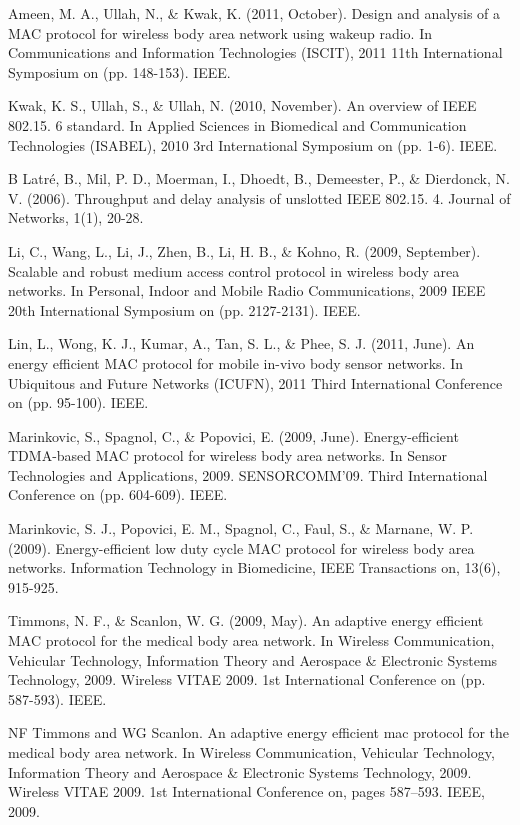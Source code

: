 \documentclass[11pt, conference, compsocconf, onecolumn]{IEEEtran}
\begin{document}
\begin{thebibliography}{0}

 Ameen, M. A., Ullah, N., \& Kwak, K. (2011, October). Design and analysis of a MAC protocol for wireless body area network using wakeup radio. In Communications and Information Technologies (ISCIT), 2011 11th International Symposium on (pp. 148-153). IEEE.
    
 Kwak, K. S., Ullah, S., \& Ullah, N. (2010, November). An overview of IEEE 802.15. 6 standard. In Applied Sciences in Biomedical and Communication Technologies (ISABEL), 2010 3rd International Symposium on (pp. 1-6). IEEE.
    
 B Latré, B., Mil, P. D., Moerman, I., Dhoedt, B., Demeester, P., \& Dierdonck, N. V. (2006). Throughput and delay analysis of unslotted IEEE 802.15. 4. Journal of Networks, 1(1), 20-28.
    
 Li, C., Wang, L., Li, J., Zhen, B., Li, H. B., \& Kohno, R. (2009, September). Scalable and robust medium access control protocol in wireless body area networks. In Personal, Indoor and Mobile Radio Communications, 2009 IEEE 20th International Symposium on (pp. 2127-2131). IEEE.
    
 Lin, L., Wong, K. J., Kumar, A., Tan, S. L., \& Phee, S. J. (2011, June). An energy efficient MAC protocol for mobile in-vivo body sensor networks. In Ubiquitous and Future Networks (ICUFN), 2011 Third International Conference on (pp. 95-100). IEEE.
    
 Marinkovic, S., Spagnol, C., \& Popovici, E. (2009, June). Energy-efficient TDMA-based MAC protocol for wireless body area networks. In Sensor Technologies and Applications, 2009. SENSORCOMM'09. Third International Conference on (pp. 604-609). IEEE.
    
 Marinkovic, S. J., Popovici, E. M., Spagnol, C., Faul, S., \& Marnane, W. P. (2009). Energy-efficient low duty cycle MAC protocol for wireless body area networks. Information Technology in Biomedicine, IEEE Transactions on, 13(6), 915-925.
    
 Timmons, N. F., \& Scanlon, W. G. (2009, May). An adaptive energy efficient MAC protocol for the medical body area network. In Wireless Communication, Vehicular Technology, Information Theory and Aerospace \& Electronic Systems Technology, 2009. Wireless VITAE 2009. 1st International Conference on (pp. 587-593). IEEE.
    
 NF Timmons and WG Scanlon. An adaptive energy efficient mac protocol for the medical body area network. In Wireless
Communication, Vehicular Technology, Information Theory and Aerospace \& Electronic Systems Technology, 2009. Wireless VITAE
2009. 1st International Conference on, pages 587–593. IEEE, 2009.
    

\end{thebibliography}
\end{document}
